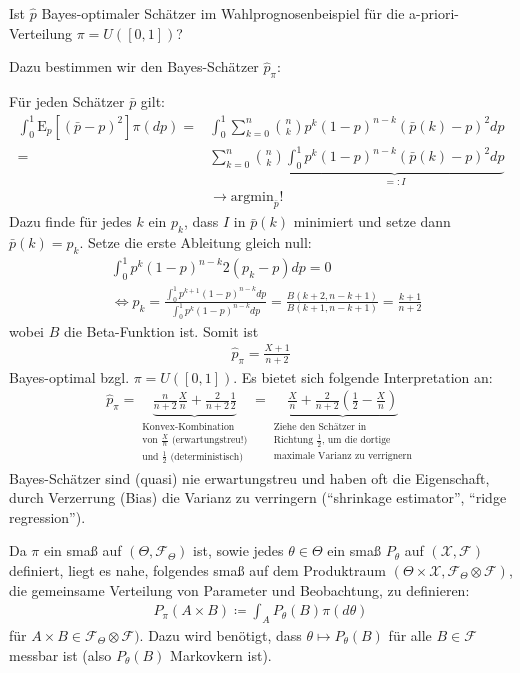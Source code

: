 \documentclass[a4paper]{scrartcl}
\begin{document}
		\begin{example}
			Ist $\hat{p}$ Bayes-optimaler Schätzer im Wahlprognosenbeispiel für die a-priori-Verteilung $\pi=U([0,1])$?
			
			Dazu bestimmen wir den Bayes-Schätzer $\hat{p}_\pi$:
			
			Für jeden Schätzer $\bar{p}$ gilt:
			\begin{align*}
				\int_0^1\mathrm{E}_p\left[\left(\bar{p}-p\right)^2\right]\pi(dp)=&\int_0^1\sum_{k=0}^n\binom{n}{k}p^k(1-p)^{n-k}\left(\bar{p}(k)-p\right)^2dp\\
				=&\sum_{k=0}^n\binom{n}{k}\underbrace{\int_0^1 p^k(1-p)^{n-k}\left(\bar{p}(k)-p\right)^2dp}_{=\colon I}\\
				&\rightarrow \text{argmin}_{\bar{p}}!
			\end{align*}
			Dazu finde für jedes $k$ ein $p_k$, dass $I$ in $\bar{p}(k)$ minimiert und setze dann $\bar{p}(k)=p_k$. Setze die erste Ableitung gleich null:
			\begin{align*}
				&\int_0^1p^k(1-p)^{n-k}2(p_k-p)dp=0\\
				&\Leftrightarrow p_k=\frac{\int_0^1p^{k+1}(1-p)^{n-k}dp}{\int_0^1p^k(1-p)^{n-k}dp}=\frac{B(k+2,n-k+1)}{B(k+1,n-k+1)}=\frac{k+1}{n+2}
			\end{align*}
			wobei $B$ die Beta-Funktion ist. Somit ist
			\begin{align*}
				\hat{p}_\pi=\frac{X+1}{n+2}
			\end{align*}
			Bayes-optimal bzgl. $\pi=U([0,1])$. Es bietet sich folgende Interpretation an:
			\begin{align*}
				\hat{p}_\pi=\underbrace{\frac{n}{n+2}\frac{X}{n}+\frac{2}{n+2}\frac{1}{2}}_{\substack{\text{Konvex-Kombination}\\\text{von }\frac{X}{n}\text{ (erwartungstreu!)}\\\text{und }\frac{1}{2}\text{ (deterministisch)}}}=\underbrace{\frac{X}{n}+\frac{2}{n+2}\left(\frac{1}{2}-\frac{X}{n}\right)}_{\substack{\text{Ziehe den Schätzer in}\\\text{Richtung }\frac{1}{2}\text{, um die dortige}\\\text{maximale Varianz zu verrignern}}}
			\end{align*}
			Bayes-Schätzer sind (quasi) nie erwartungstreu und haben oft die Eigenschaft, durch Verzerrung (Bias) die Varianz zu verringern ("`shrinkage estimator"', "`ridge regression"').
		\end{example}
		\begin{motivation}
			Da $\pi$ ein \Wk smaß auf $(\Theta,\mathscr{F}_\Theta)$ ist, sowie jedes $\theta\in\Theta$ ein \Wk smaß $P_\theta$ auf $(\mathcal{X},\mathscr{F})$ definiert, liegt es nahe, folgendes \Wk smaß auf dem Produktraum $(\Theta\times\mathcal{X},\mathscr{F}_\Theta\otimes\mathscr{F})$, die gemeinsame Verteilung von Parameter und Beobachtung, zu definieren:
			\begin{align*}
				P_\pi(A\times B)\coloneq \int_A P_\theta(B)\pi(d\theta)
			\end{align*}
			für $A\times B\in \mathscr{F}_\Theta\otimes\mathscr{F})$. Dazu wird benötigt, dass $\theta\mapsto P_\theta(B)$ für alle $B\in\mathscr{F}$ messbar ist (also $P_\theta(B)$ Markovkern ist).
		\end{motivation}
\end{document}
